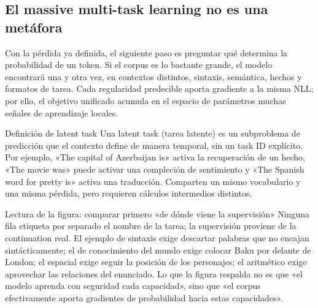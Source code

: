 \subsection{El massive multi-task learning no es una metáfora}

Con la pérdida ya definida, el siguiente paso es preguntar qué determina la probabilidad de un token. Si el corpus es lo bastante grande, el modelo encontrará una y otra vez, en contextos distintos, sintaxis, semántica, hechos y formatos de tarea. Cada regularidad predecible aporta gradiente a la misma NLL; por ello, el objetivo unificado acumula en el espacio de parámetros muchas señales de aprendizaje locales.


\begin{importantbox}{Definición de latent task}
Una latent task (tarea latente) es un subproblema de predicción que el contexto define de manera temporal, sin un task ID explícito. Por ejemplo, «The capital of Azerbaijan is» activa la recuperación de un hecho, «The movie was» puede activar una compleción de sentimiento y «The Spanish word for pretty is» activa una traducción. Comparten un mismo vocabulario y una misma pérdida, pero requieren cálculos intermedios distintos.
\end{importantbox}


\begin{knowledgebox}{Lectura de la figura: comparar primero «de dónde viene la supervisión»}
Ninguna fila etiqueta por separado el nombre de la tarea; la supervisión proviene de la continuation real. El ejemplo de sintaxis exige descartar palabras que no encajan sintácticamente; el de conocimiento del mundo exige colocar Baku por delante de London; el espacial exige seguir la posición de los personajes; el aritmético exige aprovechar las relaciones del enunciado. Lo que la figura respalda no es que «el modelo aprenda con seguridad cada capacidad», sino que «el corpus efectivamente aporta gradientes de probabilidad hacia estas capacidades».
\end{knowledgebox}


